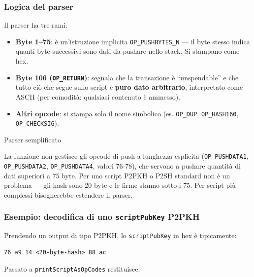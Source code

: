 \documentclass[
  italian,
  openany]{book}
\providecommand{\tightlist}{%
  \setlength{\itemsep}{0pt}\setlength{\parskip}{0pt}}
\begin{document}
\subsubsection{Logica del parser}\label{logica-del-parser}

Il parser ha tre rami:

\begin{itemize}
\tightlist
\item
  \textbf{Byte 1--75}: è un'istruzione implicita
  \texttt{OP\_PUSHBYTES\_N} --- il byte stesso indica quanti byte
  successivi sono dati da pushare nello stack. Si stampano come hex.
\item
  \textbf{Byte 106 (\texttt{OP\_RETURN})}: segnala che la transazione è
  ``unspendable'' e che tutto ciò che segue sullo script è \textbf{puro
  dato arbitrario}, interpretato come ASCII (per comodità: qualsiasi
  contenuto è ammesso).
\item
  \textbf{Altri opcode}: si stampa solo il nome simbolico (es.
  \texttt{OP\_DUP}, \texttt{OP\_HASH160}, \texttt{OP\_CHECKSIG}).
\end{itemize}

\begin{calloutwarning}{Parser semplificato}

La funzione non gestisce gli opcode di push a lunghezza esplicita
(\texttt{OP\_PUSHDATA1}, \texttt{OP\_PUSHDATA2}, \texttt{OP\_PUSHDATA4},
valori 76-78), che servono a pushare quantità di dati superiori a 75
byte. Per uno script P2PKH o P2SH standard non è un problema --- gli
hash sono 20 byte e le firme stanno sotto i 75. Per script più complessi
bisognerebbe estendere il parser.

\end{calloutwarning}

\subsubsection{\texorpdfstring{Esempio: decodifica di uno
\texttt{scriptPubKey}
P2PKH}{Esempio: decodifica di uno scriptPubKey P2PKH}}\label{esempio-decodifica-di-uno-scriptpubkey-p2pkh}

Prendendo un output di tipo P2PKH, lo \texttt{scriptPubKey} in hex è
tipicamente:

\begin{verbatim}
76 a9 14 <20-byte-hash> 88 ac
\end{verbatim}

Passato a \texttt{printScriptAsOpCodes} restituisce:
\end{document}
